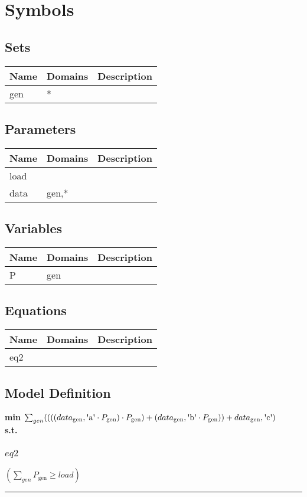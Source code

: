 \documentclass[11pt]{article}
\begin{document}
\section*{Symbols}


\subsection*{Sets}
\begin{tabularx}{\textwidth}{| l | l | X |}
\hline
\textbf{Name} & \textbf{Domains} & \textbf{Description}\\
\hline
\endhead

gen & * & \\
\hline
\end{tabularx}
\subsection*{Parameters}
\begin{tabularx}{\textwidth}{| l | l | X |}
\hline
\textbf{Name} & \textbf{Domains} & \textbf{Description}\\
\hline
\endhead

load &  & \\
data & gen,* & \\
\hline
\end{tabularx}
\subsection*{Variables}
\begin{tabularx}{\textwidth}{| l | l | X |}
\hline
\textbf{Name} & \textbf{Domains} & \textbf{Description}\\
\hline
\endhead

P & gen & \\
\hline
\end{tabularx}
\subsection*{Equations}
\begin{tabularx}{\textwidth}{| l | l | X |}
\hline
\textbf{Name} & \textbf{Domains} & \textbf{Description}\\
\hline
\endhead

eq2 &  & \\
\hline
\end{tabularx}
\subsection*{Model Definition}
\textbf{min} $\sum_{gen} ((((data_\text{gen},\text{\textquotesingle a\textquotesingle} \cdot P_\text{gen}) \cdot P_\text{gen}) + (data_\text{gen},\text{\textquotesingle b\textquotesingle} \cdot P_\text{gen})) + data_\text{gen},\text{\textquotesingle c\textquotesingle})$\\
\textbf{s.t.}
\subsubsection*{$eq2$}
$
(\sum_{gen} P_\text{gen} \geq load)
$
\vspace{5pt}
\hrule
\bigskip
\end{document}
